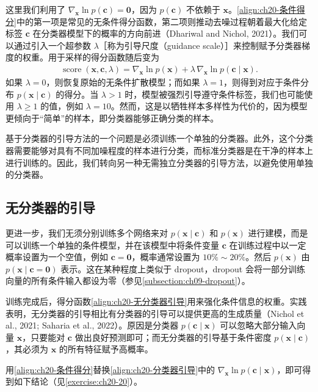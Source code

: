 \documentclass[../../main.tex]{subfiles}
\begin{document}
这里我们利用了 $\nabla_{\bm{x}}\ln p(\bm{c})=\bm{0}$，因为 $p(\bm{c})$ 不依赖于 $\bm{x}$。\eqref{align:ch20-条件得分}中的第一项是常见的无条件得分函数，第二项则推动去噪过程朝着最大化给定标签 $\bm{c}$ 在分类器模型下的概率的方向前进（Dhariwal and Nichol, 2021）。我们可以通过引入一个超参数 $\lambda$［称为引导尺度（guidance scale）］来控制赋予分类器梯度的权重。用于采样的得分函数随后变为
\begin{align}
\operatorname{score}(\bm{x},\bm{c},\lambda)=\nabla_{\bm{x}}\ln p(\bm{x})+\lambda\,\nabla_{\bm{x}}\ln p(\bm{c}\mid\bm{x}).
\label{align:ch20-分类器引导}
\end{align}
如果 $\lambda=0$，则恢复原始的无条件扩散模型；而如果 $\lambda=1$，则得到对应于条件分布 $p(\bm{x}\mid\bm{c})$ 的得分。当 $\lambda>1$ 时，模型被强烈引导遵守条件标签，我们也可能使用 $\lambda\geqslant1$ 的值，例如 $\lambda=10$。然而，这是以牺牲样本多样性为代价的，因为模型更倾向于“简单”的样本，即分类器能够正确分类的样本。

基于分类器的引导方法的一个问题是必须训练一个单独的分类器。此外，这个分类器需要能够对具有不同加噪程度的样本进行分类，而标准分类器是在干净的样本上进行训练的。因此，我们转向另一种无需独立分类器的引导方法，以避免使用单独的分类器。

\subsection{无分类器的引导}\label{subsection:ch20-无分类器的引导}

更进一步，我们无须分别训练多个网络来对 $p(\bm{x}\mid\bm{c})$ 和 $p(\bm{x})$ 进行建模，而是可以训练一个单独的条件模型，并在该模型中将条件变量 $\bm{c}$ 在训练过程中以一定概率设置为一个空值，例如 $\bm{c}=\bm{0}$，概率通常设置为 $10\%\sim20\%$。然后 $p(\bm{x})$ 由 $p(\bm{x}\mid\bm{c}=\bm{0})$ 表示。这在某种程度上类似于 dropout，dropout 会将一部分训练向量的所有条件输入都设为零（参见\cref{subsection:ch09-dropout}）。

训练完成后，得分函数\eqref{align:ch20-无分类器引导}用来强化条件信息的权重。实践表明，无分类器的引导相比有分类器的引导可以提供更高的生成质量（Nichol et al., 2021; Saharia et al., 2022）。原因是分类器 $p(\bm{c}\mid\bm{x})$ 可以忽略大部分输入向量 $\bm{x}$，只要能对 $\bm{c}$ 做出良好预测即可；而无分类器的引导基于条件密度 $p(\bm{x}\mid\bm{c})$，其必须为 $\bm{x}$ 的所有特征赋予高概率。

用\eqref{align:ch20-条件得分}替换\eqref{align:ch20-分类器引导}中的 $\nabla_{\bm{x}}\ln p(\bm{c}\mid\bm{x})$，即可得到如下结论（见\cref{exercise:ch20-20}）。
\end{document}
